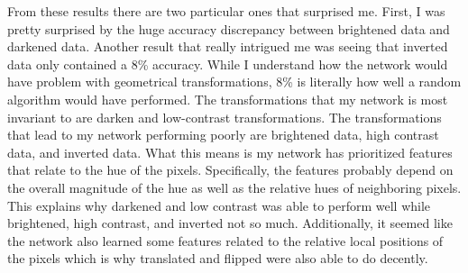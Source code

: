 \documentclass{article}
\begin{document}
From these results there are two particular ones that surprised me. First, I was pretty surprised by the huge accuracy discrepancy between brightened data and darkened data. Another result that really intrigued me was seeing that inverted data only contained a 8\% accuracy. While I understand how the network would have problem with geometrical transformations, 8\% is literally how well a random algorithm would have performed. The transformations that my network is most invariant to are darken and low-contrast transformations. The transformations that lead to my network performing poorly are brightened data, high contrast data, and inverted data. What this means is my network has prioritized features that relate to the hue of the pixels. Specifically, the features probably depend on the overall magnitude of the hue as well as the relative hues of neighboring pixels. This explains why darkened and low contrast was able to perform well while brightened, high contrast, and inverted not so much. Additionally, it seemed like the network also learned some features related to the relative local positions of the pixels which is why translated and flipped were also able to do decently. 
\end{document}
